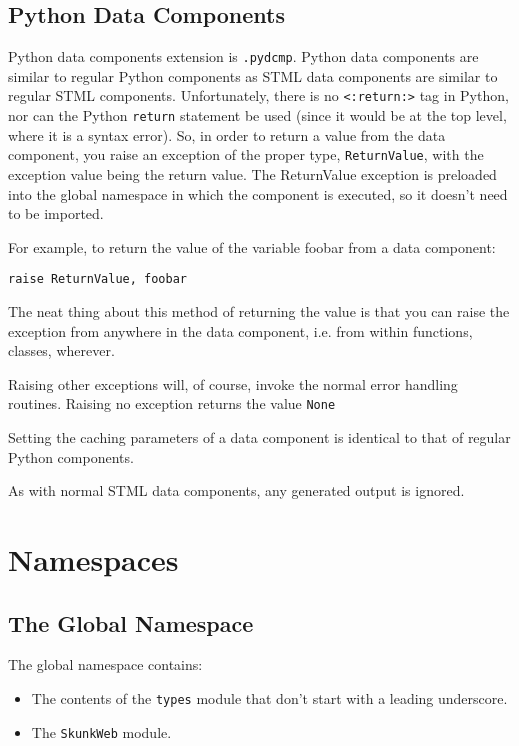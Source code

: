 \documentclass{manual}
\begin{document}
\section{Python Data Components}
\label{pythondata}
Python data components extension is \texttt{.pydcmp}.  Python data
components are similar to regular Python components as STML data
components are similar to regular STML components.  Unfortunately,
there is no \texttt{<:return:>} tag in Python, nor can the Python
\texttt{return} statement be used (since it would be at the top
level, where it is a syntax error).  So, in order to return a value
from the data component, you 
raise an exception of the proper type, \texttt{ReturnValue}, with the
exception value being the return value.  The ReturnValue exception is
preloaded into the global namespace in which the component is
executed, so it doesn't need to be imported.

For example, to return the value of the variable foobar from a data
component:
\begin{verbatim}
raise ReturnValue, foobar
\end{verbatim}


The neat thing about this method of returning the value is that you
can raise the exception from anywhere in the data component, i.e. from
within functions, classes, wherever.

Raising other exceptions will, of course, invoke the normal error
handling routines.  Raising no exception returns the value \texttt{None}

Setting the caching parameters of a data component is identical to that of
regular Python components.

As with normal STML data components, any generated output is ignored.



\chapter{Namespaces}
\label{namespaces}


\section{The Global Namespace}
\label{globalns}

The global namespace contains:
\begin{itemize}
\item The contents of the \texttt{types} module that don't start with a
leading underscore. 
\item The \texttt{SkunkWeb} module.
\end{itemize}
\end{document}
